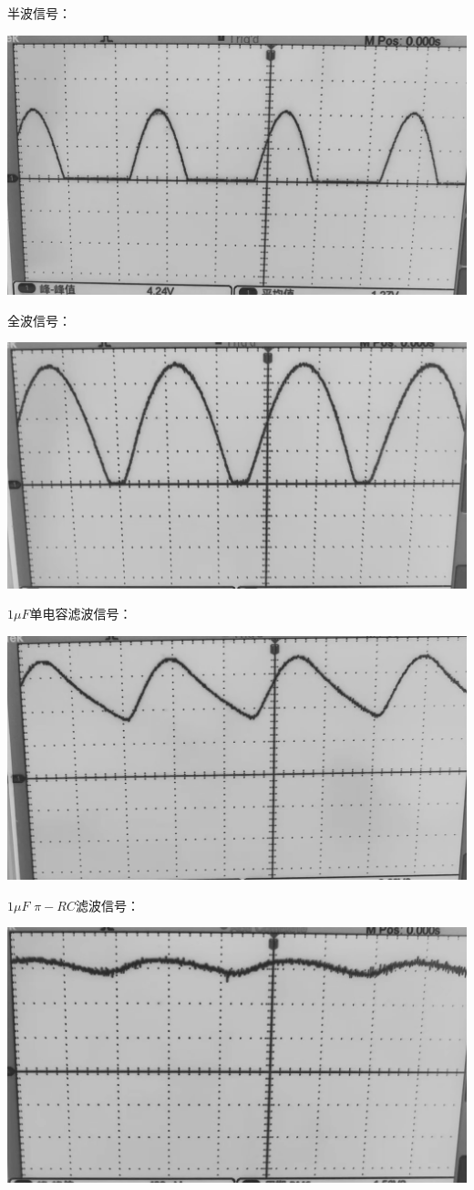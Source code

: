 \documentclass[a4paper]{ltxdoc}
\newenvironment{Figure}
{\par\medskip\noindent\minipage{\linewidth}}
{\endminipage\par\medskip}
\begin{document}
\begin{multicols}{2}
    半波信号：
    \begin{Figure}
        \centering
        \includegraphics[width=0.7\linewidth]{img/done_edit/1.png}
    \end{Figure}

    全波信号：
    \begin{Figure}
        \centering
        \includegraphics[width=0.7\linewidth]{img/done_edit/5.png}
    \end{Figure}

    $1\mu F$单电容滤波信号：
    \begin{Figure}
        \centering
        \includegraphics[width=0.7\linewidth]{img/done_edit/9.png}
    \end{Figure}

    $1\mu F$ $\pi - RC$滤波信号：
    \begin{Figure}
        \centering
        \includegraphics[width=0.7\linewidth]{img/done_edit/10.png}
    \end{Figure}


\end{multicols}
\end{document}
